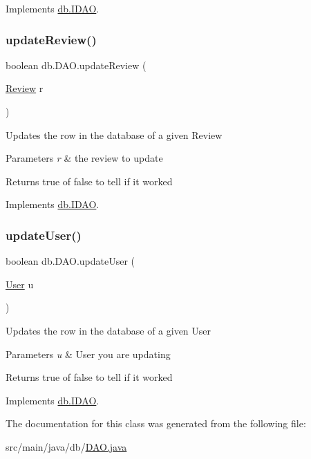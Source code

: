 Implements \hyperlink{interfacedb_1_1_i_d_a_o_a202354d7a3e1231687d543e82c15a6f5}{db.\+I\+D\+AO}.

\mbox{\label{classdb_1_1_d_a_o_ab73940ac7600902ea7d52bcd041a9c6e}} 
\subsubsection{\texorpdfstring{update\+Review()}{updateReview()}}
{\footnotesize\ttfamily boolean db.\+D\+A\+O.\+update\+Review (\begin{DoxyParamCaption}\item[{\hyperlink{classserver_1_1data_1_1_review}{Review}}]{r }\end{DoxyParamCaption})}

Updates the row in the database of a given Review 
\begin{DoxyParams}{Parameters}
{\em r} & the review to update \\
\hline
\end{DoxyParams}
\begin{DoxyReturn}{Returns}
true of false to tell if it worked 
\end{DoxyReturn}


Implements \hyperlink{interfacedb_1_1_i_d_a_o_a7288e76ee3ce667c0d0d7ecaeef0d94e}{db.\+I\+D\+AO}.

\mbox{\label{classdb_1_1_d_a_o_a5cd4462deb77065c2d12471cd73b3ec8}} 
\subsubsection{\texorpdfstring{update\+User()}{updateUser()}}
{\footnotesize\ttfamily boolean db.\+D\+A\+O.\+update\+User (\begin{DoxyParamCaption}\item[{\hyperlink{classserver_1_1data_1_1_user}{User}}]{u }\end{DoxyParamCaption})}

Updates the row in the database of a given User 
\begin{DoxyParams}{Parameters}
{\em u} & User you are updating \\
\hline
\end{DoxyParams}
\begin{DoxyReturn}{Returns}
true of false to tell if it worked 
\end{DoxyReturn}


Implements \hyperlink{interfacedb_1_1_i_d_a_o_adbc5f00b7bcdffb6692367a3c9564193}{db.\+I\+D\+AO}.



The documentation for this class was generated from the following file\+:\begin{DoxyCompactItemize}
\item 
src/main/java/db/\hyperlink{_d_a_o_8java}{D\+A\+O.\+java}\end{DoxyCompactItemize}
